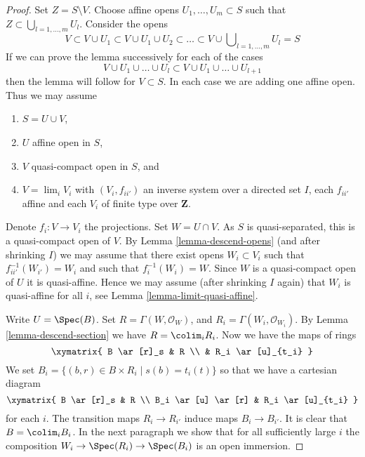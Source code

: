 \begin{proof}
Set $Z = S \setminus V$. Choose affine opens $U_1, \ldots, U_m \subset S$
such that $Z \subset \bigcup_{l = 1, \ldots, m} U_l$. Consider the opens
$$
V \subset V \cup U_1 \subset V \cup U_1 \cup U_2 \subset
\ldots \subset V \cup \bigcup\nolimits_{l = 1, \ldots, m} U_l = S
$$
If we can prove the lemma successively for each of the cases
$$
V \cup U_1 \cup \ldots \cup U_l
\subset
V \cup U_1 \cup \ldots \cup U_{l + 1}
$$
then the lemma will follow for $V \subset S$. In each case we are adding
one affine open. Thus we may assume
\begin{enumerate}
\item $S = U \cup V$,
\item $U$ affine open in $S$,
\item $V$ quasi-compact open in $S$, and
\item $V = \lim_i V_i$ with $(V_i, f_{ii'})$
an inverse system over a directed set $I$, each $f_{ii'}$
affine and each $V_i$ of finite type over $\mathbf{Z}$.
\end{enumerate}
Denote $f_i : V \to V_i$ the projections.
Set $W = U \cap V$. As $S$ is quasi-separated, this is a quasi-compact open
of $V$. By Lemma \ref{lemma-descend-opens}
(and after shrinking $I$) we may assume that there exist
opens $W_i \subset V_i$ such that $f_{ii'}^{-1}(W_{i'}) = W_i$
and such that $f_i^{-1}(W_i) = W$. Since $W$ is a quasi-compact open
of $U$ it is quasi-affine. Hence we may assume (after shrinking $I$ again)
that $W_i$ is quasi-affine for all $i$, see
Lemma \ref{lemma-limit-quasi-affine}.

\medskip\noindent
Write $U = \Spec(B)$. Set $R = \Gamma(W, \mathcal{O}_W)$,
and $R_i = \Gamma(W_i, \mathcal{O}_{W_i})$.
By Lemma \ref{lemma-descend-section} we have $R = \colim_i R_i$.
Now we have the maps of rings
$$
\xymatrix{
B \ar[r]_s & R \\
& R_i \ar[u]_{t_i}
}
$$
We set $B_i = \{(b, r) \in B \times R_i \mid s(b) = t_i(t)\}$ so that we
have a cartesian diagram
$$
\xymatrix{
B \ar[r]_s & R \\
B_i \ar[u] \ar[r] & R_i \ar[u]_{t_i}
}
$$
for each $i$. The transition maps $R_i \to R_{i'}$ induce maps
$B_i \to B_{i'}$. It is clear that $B = \colim_i B_i$.
In the next paragraph we show that for all sufficiently large $i$
the composition $W_i \to \Spec(R_i) \to \Spec(B_i)$ is an open immersion.


\end{proof}
